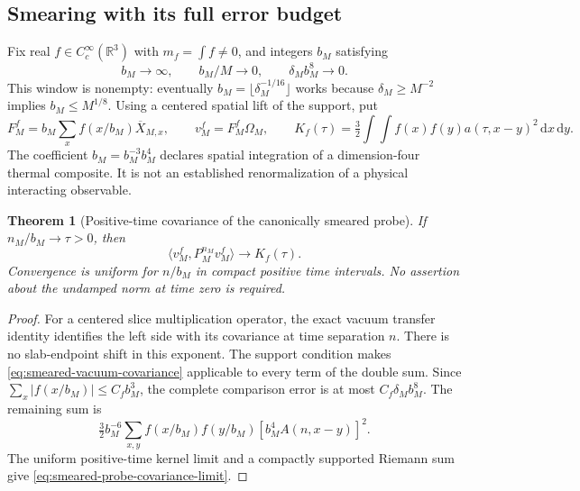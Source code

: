 \documentclass[11pt,oneside,openany]{book}
\newtheorem{theorem}{Theorem}[chapter]
\theoremstyle{definition}
\theoremstyle{remark}
\newcommand{\dd}{\mathrm d}
\begin{document}
\subsection{Smearing with its full error budget}
Fix real $f\in C_c^\infty(\mathbb R^3)$ with
$m_f=\int f\ne0$, and integers $b_M$ satisfying
\begin{equation}
 b_M\to\infty,\qquad b_M/M\to0,
                       \qquad \delta_M b_M^8\to0.
 \label{eq:smeared-probe-window}
\end{equation}
This window is nonempty: eventually
$b_M=\lfloor\delta_M^{-1/16}\rfloor$ works because
$\delta_M\ge M^{-2}$ implies $b_M\le M^{1/8}$.
Using a centered spatial lift of the support, put
\begin{equation}
 F_M^f=b_M\sum_x f(x/b_M)\overline X_{M,x},
 \qquad v_M^f=F_M^f\Omega_M,
 \qquad
 K_f(\tau)=\tfrac32\int\!\!\int
                   f(x)f(y)a(\tau,x-y)^2\,\dd x\,\dd y.
 \label{eq:smeared-probe-and-covariance}
\end{equation}
The coefficient $b_M=b_M^{-3}b_M^4$ declares spatial integration
of a dimension-four thermal composite. It is not an established
renormalization of a physical interacting observable.

\begin{theorem}[Positive-time covariance of the canonically smeared probe]
\label{thm:smeared-probe-covariance}
If $n_M/b_M\to\tau>0$, then
\begin{equation}
 \langle v_M^f,P_M^{n_M}v_M^f\rangle\longrightarrow K_f(\tau).
 \label{eq:smeared-probe-covariance-limit}
\end{equation}
Convergence is uniform for $n/b_M$ in compact positive time
intervals. No assertion about the undamped norm at time zero is
required.
\end{theorem}
\begin{proof}
For a centered slice multiplication operator, the exact vacuum
transfer identity identifies the left side with its covariance at
time separation $n$. There is no slab-endpoint shift in this exponent.
The support condition makes \cref{eq:smeared-vacuum-covariance}
applicable to every term of the double sum. Since
$\sum_x|f(x/b_M)|\le C_fb_M^3$, the complete comparison error is
at most $C_f\delta_Mb_M^8$. The remaining sum is
\[
 \tfrac32b_M^{-6}\sum_{x,y}f(x/b_M)f(y/b_M)
                                  [b_M^4A(n,x-y)]^2.
\]
The uniform positive-time kernel limit and a compactly supported
Riemann sum give \cref{eq:smeared-probe-covariance-limit}.
\end{proof}
\end{document}
